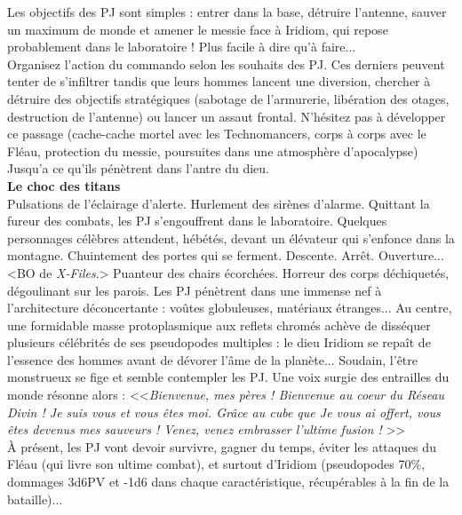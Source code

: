 \documentclass[11pt,twoside,a4paper]{book}
\begin{document}
Les objectifs des PJ sont simples : entrer dans la base, d{\'e}truire l'antenne, sauver un maximum de monde et amener le messie face {\`a} Iridiom, qui repose probablement dans le laboratoire ! Plus facile {\`a} dire qu'{\`a} faire...~\\

Organisez l'action du commando selon les souhaits des PJ. Ces derniers peuvent tenter de s'infiltrer tandis que leurs hommes lancent une diversion, chercher {\`a} d{\'e}truire des objectifs strat{\'e}giques (sabotage de l'armurerie, lib{\'e}ration des otages, destruction de l'antenne) ou lancer un assaut frontal. N'h{\'e}sitez pas {\`a} d{\'e}velopper ce passage (cache-cache mortel avec les Technomancers, corps {\`a} corps avec le Fl{\'e}au, protection du messie, poursuites dans une atmosph{\`e}re d'apocalypse) Jusqu'a ce qu'ils p{\'e}n{\`e}trent dans l'antre du dieu.~\\

\textbf{\large Le choc des titans}~\\

Pulsations de l'{\'e}clairage d'alerte. Hurlement des sir{\`e}nes d'alarme. Quittant la fureur des combats, les PJ s'engouffrent dans le laboratoire. Quelques personnages c{\'e}l{\`e}bres attendent, h{\'e}b{\'e}t{\'e}s, devant un {\'e}l{\'e}vateur qui s'enfonce dans la montagne. Chuintement des portes qui se ferment. Descente. Arr{\^e}t. Ouverture...~\\

<BO de \emph{X-Files}.> Puanteur des chairs {\'e}corch{\'e}es. Horreur des corps d{\'e}chiquet{\'e}s, d{\'e}goulinant sur les parois. Les PJ p{\'e}n{\`e}trent dans une immense nef {\`a} l'architecture d{\'e}concertante : vo{\^u}tes globuleuses, mat{\'e}riaux {\'e}tranges... Au centre, une formidable masse protoplasmique aux reflets chrom{\'e}s ach{\`e}ve de diss{\'e}quer plusieurs c{\'e}l{\'e}brit{\'e}s de ses pseudopodes multiples : le dieu Iridiom se repa{\^i}t de l'essence des hommes avant de d{\'e}vorer l'{\^a}me de la plan{\`e}te... Soudain, l'{\^e}tre monstrueux se fige et semble contempler les PJ. Une voix surgie des entrailles du monde r{\'e}sonne alors : <<\emph{Bienvenue, mes p{\`e}res ! Bienvenue au coeur du R{\'e}seau Divin ! Je suis vous et vous {\^e}tes moi. Gr{\^a}ce au cube que Je vous ai offert, vous {\^e}tes devenus mes sauveurs ! Venez, venez embrasser l'ultime fusion ! } >>~\\

{\`A} pr{\'e}sent, les PJ vont devoir survivre, gagner du temps, {\'e}viter les attaques du Fl{\'e}au (qui livre son ultime combat), et surtout d'Iridiom (pseudopodes 70\%, dommages 3d6PV et -1d6 dans chaque caract{\'e}ristique, r{\'e}cup{\'e}rables {\`a} la fin de la bataille)...~\\
\end{document}
